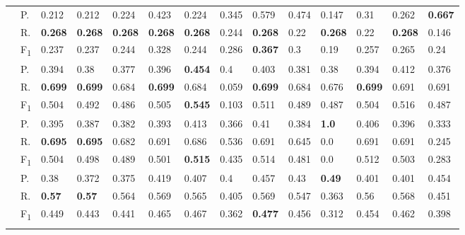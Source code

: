 \begin{tabularx}{\hsize}{p{1.3em}l Z  Z  Z  Z  Z  Z  Z  Z  Z  Z  Z  Z }
    & P.    & 0.212    & 0.212    & 0.224    & 0.423    & 0.224    & 0.345    & 0.579    & 0.474    & 0.147    & 0.31    & 0.262    & \textbf{ 0.667 } \\
    & R.    & \textbf{ 0.268 }    & \textbf{ 0.268 }    & \textbf{ 0.268 }    & \textbf{ 0.268 }    & \textbf{ 0.268 }    & 0.244    & \textbf{ 0.268 }    & 0.22    & \textbf{ 0.268 }    & 0.22    & \textbf{ 0.268 }    & 0.146 \\
    & F\textsubscript{1}    & 0.237    & 0.237    & 0.244    & 0.328    & 0.244    & 0.286    & \textbf{ 0.367 }    & 0.3    & 0.19    & 0.257    & 0.265    & 0.24 \\
     \midrule {}

    & P.    & 0.394    & 0.38    & 0.377    & 0.396    & \textbf{ 0.454 }    & 0.4    & 0.403    & 0.381    & 0.38    & 0.394    & 0.412    & 0.376 \\
    & R.    & \textbf{ 0.699 }    & \textbf{ 0.699 }    & 0.684    & \textbf{ 0.699 }    & 0.684    & 0.059    & \textbf{ 0.699 }    & 0.684    & 0.676    & \textbf{ 0.699 }    & 0.691    & 0.691 \\
    & F\textsubscript{1}    & 0.504    & 0.492    & 0.486    & 0.505    & \textbf{ 0.545 }    & 0.103    & 0.511    & 0.489    & 0.487    & 0.504    & 0.516    & 0.487 \\
     \midrule {}

    & P.    & 0.395    & 0.387    & 0.382    & 0.393    & 0.413    & 0.366    & 0.41    & 0.384    & \textbf{ 1.0 }    & 0.406    & 0.396    & 0.333 \\
    & R.    & \textbf{ 0.695 }    & \textbf{ 0.695 }    & 0.682    & 0.691    & 0.686    & 0.536    & 0.691    & 0.645    & 0.0    & 0.691    & 0.691    & 0.245 \\
    & F\textsubscript{1}    & 0.504    & 0.498    & 0.489    & 0.501    & \textbf{ 0.515 }    & 0.435    & 0.514    & 0.481    & 0.0    & 0.512    & 0.503    & 0.283 \\
     \midrule {}

    & P.    & 0.38    & 0.372    & 0.375    & 0.419    & 0.407    & 0.4    & 0.457    & 0.43    & \textbf{ 0.49 }    & 0.401    & 0.401    & 0.454 \\
    & R.    & \textbf{ 0.57 }    & \textbf{ 0.57 }    & 0.564    & 0.569    & 0.565    & 0.405    & 0.569    & 0.547    & 0.363    & 0.56    & 0.568    & 0.451 \\
    & F\textsubscript{1}    & 0.449    & 0.443    & 0.441    & 0.465    & 0.467    & 0.362    & \textbf{ 0.477 }    & 0.456    & 0.312    & 0.454    & 0.462    & 0.398 \\
     \midrule {}


\end{tabularx}
